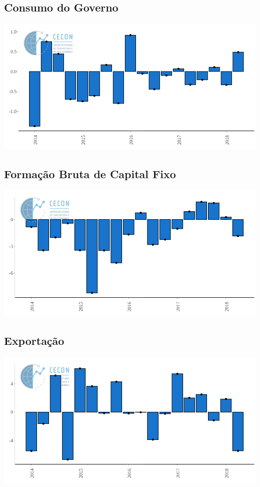 \documentclass[11pt,portuguese,]{article}
\begin{document}
\subsection{Consumo do Governo}\label{consumo-do-governo}

\begin{center}\includegraphics[width=1\linewidth]{Grafico_CGov} \end{center}

\subsection{Formação Bruta de Capital
Fixo}\label{formacao-bruta-de-capital-fixo}

\begin{center}\includegraphics[width=1\linewidth]{Grafico_FBCF} \end{center}

\subsection{Exportação}\label{exportacao}

\begin{center}\includegraphics[width=1\linewidth]{Grafico_Export} \end{center}
\end{document}
